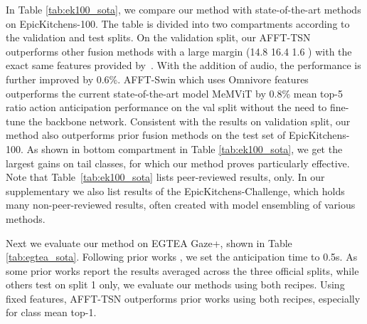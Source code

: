 \documentclass[10pt,twocolumn,letterpaper,dvipsnames]{article}
\newcommand{\sname}{AFFT}
\begin{document}
In Table \ref{tab:ek100_sota}, we compare our method with state-of-the-art methods on EpicKitchens-100. The table is divided into two compartments according to the validation and test splits. On the validation split, our \sname-TSN outperforms other fusion methods with a large margin (14.8  16.4  1.6 ) with the exact same features provided by~\cite{furnariWhatWouldYou2019}. With the addition of audio, the performance is further improved by 0.6\%. \sname-Swin which uses Omnivore features outperforms the current state-of-the-art model MeMViT by 0.8\% mean top-5 ratio action anticipation performance on the val split without the need to fine-tune the backbone network.
Consistent with the results on validation split, our method also outperforms prior fusion methods on the test set of EpicKitchens-100. As shown in bottom compartment in Table \ref{tab:ek100_sota}, we get the largest gains on tail classes, for which our method proves particularly effective. Note that Table~\ref{tab:ek100_sota} lists peer-reviewed results, only. In our supplementary we also list results of the EpicKitchens-Challenge, which holds many non-peer-reviewed results, often created with model ensembling of various methods.

Next we evaluate our method on EGTEA Gaze+, shown in Table \ref{tab:egtea_sota}. Following prior works \cite{liuForecastingHumanObjectInteraction2020,girdharAnticipativeVideoTransformer2021}, we set the anticipation time  to 0.5s. As some prior works report the results averaged across the three official splits, while others test on split 1 only, we evaluate our methods using both recipes. Using fixed features, \sname-TSN outperforms prior works using both recipes, especially for class mean top-1.
\end{document}
